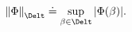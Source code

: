 \begin{equation} \label{seminorm}
{\|\Phi\|}_\Delt \doteq \sup_{\beta \in \Delt} |\Phi(\beta)|.
\end{equation}

